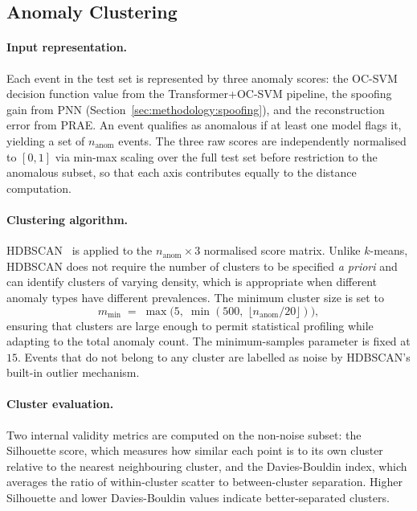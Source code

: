 \documentclass[11pt]{report}
\begin{document}
\subsection{Anomaly Clustering}\label{sec:methodology:posthoc:clustering}

\paragraph{Input representation.}
Each event in the test set is represented by three anomaly scores: the OC-SVM decision function value from the Transformer+OC-SVM pipeline, the spoofing gain from PNN (Section~\ref{sec:methodology:spoofing}), and the reconstruction error from PRAE. An event qualifies as anomalous if at least one model flags it, yielding a set of $n_{\text{anom}}$ events. The three raw scores are independently normalised to $[0, 1]$ via min-max scaling over the full test set before restriction to the anomalous subset, so that each axis contributes equally to the distance computation.

\paragraph{Clustering algorithm.}
HDBSCAN~\cite{campello2013density} is applied to the $n_{\text{anom}} \times 3$ normalised score matrix. Unlike $k$-means, HDBSCAN does not require the number of clusters to be specified \textit{a priori} and can identify clusters of varying density, which is appropriate when different anomaly types have different prevalences. The minimum cluster size is set to
\[
    m_{\min} \;=\; \max\!\bigl(5,\; \min(500,\; \lfloor n_{\text{anom}} / 20 \rfloor)\bigr),
\]
ensuring that clusters are large enough to permit statistical profiling while adapting to the total anomaly count.
The minimum-samples parameter is fixed at $15$. Events that do not belong to any cluster are labelled as noise by HDBSCAN's built-in outlier mechanism.

\paragraph{Cluster evaluation.}
Two internal validity metrics are computed on the non-noise subset: the Silhouette score, which measures how similar each point is to its own cluster relative to the nearest neighbouring cluster, and the Davies-Bouldin index, which averages the ratio of within-cluster scatter to between-cluster separation. Higher Silhouette and lower Davies-Bouldin values indicate better-separated clusters.
\end{document}
